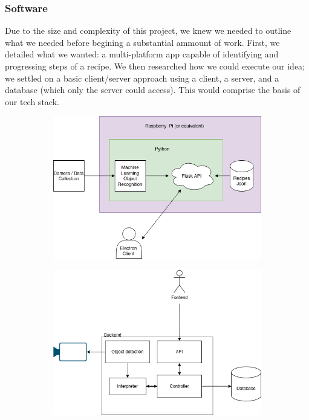 \documentclass{article}
\begin{document}
    \subsubsection{Software}
    Due to the size and complexity of this project, we knew we needed to outline what we needed before begining a substantial ammount of work. First, we detailed what we wanted: a multi-platform app capable of identifying and progressing steps of a recipe. We then researched how we could execute our idea; we settled on a basic client/server approach using a client, a server, and a database (which only the server could access). This would comprise the basis of our tech stack.

    \begin{figure}[t]
      \centering
      \begin{subfigure}{0.45\linewidth}
        \includegraphics[width=\linewidth]{assets/first-architecture.png}
        \caption{}
        \label{fig:architectureA}
      \end{subfigure}
      \hfill
      \begin{subfigure}{0.45\linewidth}
        \includegraphics[width=\linewidth]{assets/second-architecture.png}

\end{subfigure}
\end{figure}
\end{document}
